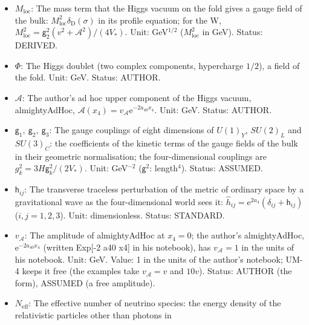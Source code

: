 \documentclass[
  10pt,
]{article}
\begin{document}
\begin{itemize}
  \(v_{\mathrm{loc}}\): The local value of the electroweak vacuum,
  \(v_{\mathrm{loc}}^2 = 2\langle\Phi^\dagger\Phi\rangle\): it sets the
  local masses of the quarks and leptons (each mass times
  \(v_{\mathrm{loc}}/v\)) and the local Fermi constant;
  \(v_{\mathrm{loc}} = v\) in the Standard-Model vacuum. Unit: GeV.
  Value: \(v\) in the late universe outside dense dirac16complex.
  Status: DERIVED.
\item
  \(M_{\mathrm{loc}}\): The mass term that the Higgs vacuum on the fold
  gives a gauge field of the bulk:
  \(M_{\mathrm{loc}}^2\delta_{\mathrm{D}}(\sigma)\) in its profile
  equation; for the W,
  \(M_{\mathrm{loc}}^2 = \mathsf{g}_2^2(v^2 + \mathcal{A}^2)/(4V_*)\).
  Unit: GeV\(^{1/2}\) (\(M_{\mathrm{loc}}^2\) in GeV). Status: DERIVED.
\item
  \(\Phi\): The Higgs doublet (two complex components, hypercharge
  \(1/2\)), a field of the fold. Unit: GeV. Status: AUTHOR.
\item
  \(\mathcal{A}\): The author's ad hoc upper component of the Higgs
  vacuum, almightyAdHoc,
  \(\mathcal{A}(x_4) = v_{\mathcal{A}}\mathrm{e}^{-2a_{40}x_4}\). Unit:
  GeV. Status: AUTHOR.
\item
  \(\mathsf{g}_1,\ \mathsf{g}_2,\ \mathsf{g}_3\): The gauge couplings of
  eight dimensions of \(U(1)_Y\), \(SU(2)_L\) and \(SU(3)_C\): the
  coefficients of the kinetic terms of the gauge fields of the bulk in
  their geometric normalisation; the four-dimensional couplings are
  \(g_k^2 = 3H\mathsf{g}_k^2/(2V_*)\). Unit: GeV\(^{-2}\)
  (\(\mathsf{g}^2\): length\(^4\)). Status: ASSUMED.
\item
  \(\mathsf{h}_{ij}\): The transverse traceless perturbation of the
  metric of ordinary space by a gravitational wave as the
  four-dimensional world sees it:
  \(\hat h_{ij} = \mathrm{e}^{2a_4}(\delta_{ij} + \mathsf{h}_{ij})\)
  (\(i, j = 1, 2, 3\)). Unit: dimensionless. Status: STANDARD.
\item
  \(v_{\mathcal{A}}\): The amplitude of almightyAdHoc at \(x_4 = 0\);
  the author's almightyAdHoc, \(\mathrm{e}^{-2a_{40}x_4}\) (written
  Exp{[}-2 a40 x4{]} in his notebook), has \(v_{\mathcal{A}} = 1\) in
  the units of his notebook. Unit: GeV. Value: 1 in the units of the
  author's notebook; UM-4 keeps it free (the examples take
  \(v_{\mathcal{A}} = v\) and \(10v\)). Status: AUTHOR (the form),
  ASSUMED (a free amplitude).
\item
  \(N_{\mathrm{eff}}\): The effective number of neutrino species: the
  energy density of the relativistic particles other than photons in

\end{itemize}
\end{document}
